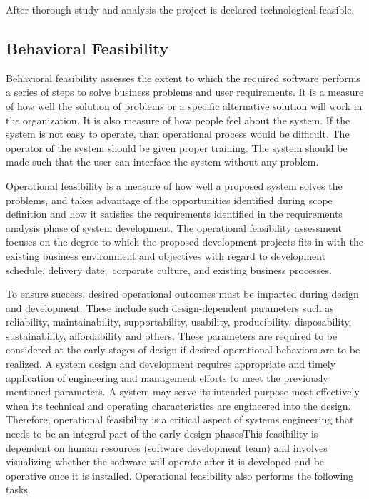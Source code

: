 After thorough study and analysis the project is declared technological feasible.
\subsection{Behavioral Feasibility}
Behavioral feasibility assesses the extent to which the required software performs a series of steps to solve business problems and user requirements. It is a measure of how well the solution of problems or a specific alternative solution will work in the organization. It is also measure of how people feel about the system. If the system is not easy to operate, than operational process would be difficult. The operator of the system should be given proper training. The system should be made such that the user can interface the system without any problem.

Operational feasibility is a measure of how well a proposed system solves the problems, and takes advantage of the opportunities identified during scope definition and how it satisfies the requirements identified in the requirements analysis phase of system development. The operational feasibility assessment focuses on the degree to which the proposed development projects fits in with the existing business environment and objectives with regard to development schedule, delivery date, corporate culture, and existing business processes.

To ensure success, desired operational outcomes must be imparted during design and development. These include such design-dependent parameters such as reliability, maintainability, supportability, usability, producibility, disposability, sustainability, affordability and others. These parameters are required to be considered at the early stages of design if desired operational behaviors are to be realized. A system design and development requires appropriate and timely application of engineering and management efforts to meet the previously mentioned parameters. A system may serve its intended purpose most effectively when its technical and operating characteristics are engineered into the design. Therefore, operational feasibility is a critical aspect of systems engineering that needs to be an integral part of the early design phasesThis feasibility is dependent on human resources (software development team) and involves visualizing whether the software will operate after it is developed and be operative once it is installed. Operational feasibility also performs the following tasks.

